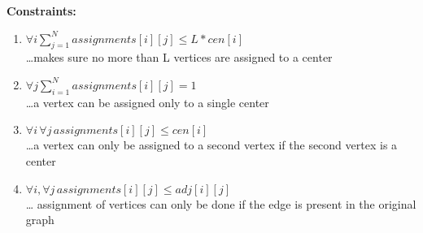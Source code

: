 \documentclass[12pt,a4paper,onecolumn]{article}
\begin{document}
\textbf{Constraints:}
\begin{enumerate}
\item $\forall i \sum_{j=1}^{N}assignments[i][j]\leq L*cen[i]$\\\hspace{1cm}\ldots makes sure no more than L vertices are assigned to a center
\item $\forall j \sum_{i=1}^{N}assignments[i][j] = 1$\\\hspace{1cm}\ldots a vertex can be assigned only to a single center
\item $\forall i \, \forall j \, assignments[i][j] \leq cen[i]$\\\hspace{1cm}\ldots a vertex can only be assigned to a second vertex if the second vertex is a center
\item $\forall i , \forall j \, assignments[i][j] \leq adj[i][j]$\\\hspace{1cm}\ldots 
assignment of vertices can only be done if the edge is present in the original graph

\end{enumerate}
\end{document}
